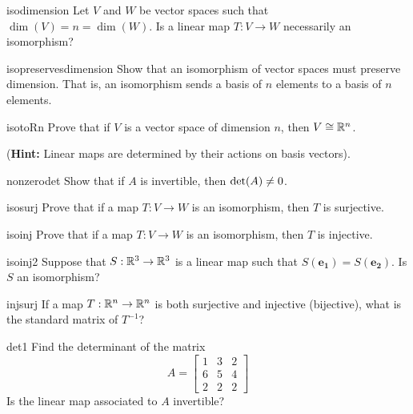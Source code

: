 \begin{problem}{isodimension}
    Let $V$ and $W$ be vector spaces such that $\dim(V) = n = \dim(W)$.  Is a linear map $T: V \to W$ necessarily an isomorphism?
\end{problem}

\begin{problem}{isopreservesdimension}
    Show that an isomorphism of vector spaces must preserve dimension.  That is, an isomorphism sends a basis of $n$ elements to a basis of $n$ elements.
\end{problem}

\begin{problem}{isotoRn}
    Prove that if $V$ is a vector space of dimension $n$, then $V \cong \mathbb{R}^n$.  
    
    (\textbf{Hint:} Linear maps are determined by their actions on basis vectors).
\end{problem}

\begin{problem}{nonzerodet}
    Show that if $A$ is invertible, then $\textnormal{det}(A) \neq 0$.
\end{problem}

\begin{problem}{isosurj}
    Prove that if a map $T : V \to W$ is an isomorphism, then $T$ is surjective.
\end{problem}

\begin{problem}{isoinj}
    Prove that if a map $T : V \to W$ is an isomorphism, then $T$ is injective.
\end{problem}

\begin{problem}{isoinj2}
    Suppose that $S: \mathbb{R}^3 \to \mathbb{R}^3$ is a linear map such that $S(\bm{e_1}) = S(\bm{e_2})$.  Is $S$ an isomorphism?
\end{problem}

\begin{problem}{injsurj}
    If a map $T : \mathbb{R}^n \to \mathbb{R}^n$ is both surjective and injective (bijective), what is the standard matrix of $T^{-1}$?
\end{problem}

\begin{problem}{det1}
     Find the determinant of the matrix \begin{equation*}
A = 
\begin{bmatrix}
1 & 3 & 2 \\
6 & 5 & 4 \\
2 & 2 & 2
\end{bmatrix}
\end{equation*}
Is the linear map associated to $A$ invertible?
\end{problem}

